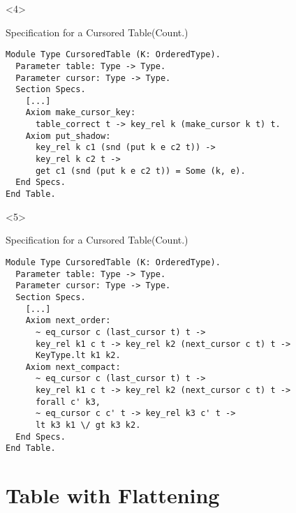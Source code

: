 \documentclass{beamer}
\begin{document}
\begin{frame}[t,fragile]
\begin{onlyenv}<4>
  \begin{block}{Specification for a Cursored Table(Count.)}
    \begin{verbatim}
Module Type CursoredTable (K: OrderedType).
  Parameter table: Type -> Type.
  Parameter cursor: Type -> Type.
  Section Specs.
    [...]
    Axiom make_cursor_key:
      table_correct t -> key_rel k (make_cursor k t) t.
    Axiom put_shadow:
      key_rel k c1 (snd (put k e c2 t)) ->
      key_rel k c2 t ->
      get c1 (snd (put k e c2 t)) = Some (k, e).
  End Specs.
End Table.
    \end{verbatim}
  \end{block}
\end{onlyenv}


\begin{onlyenv}<5>
  \begin{block}{Specification for a Cursored Table(Count.)}
    \begin{verbatim}
Module Type CursoredTable (K: OrderedType).
  Parameter table: Type -> Type.
  Parameter cursor: Type -> Type.
  Section Specs.
    [...]
    Axiom next_order:
      ~ eq_cursor c (last_cursor t) t ->
      key_rel k1 c t -> key_rel k2 (next_cursor c t) t ->
      KeyType.lt k1 k2.
    Axiom next_compact:
      ~ eq_cursor c (last_cursor t) t ->
      key_rel k1 c t -> key_rel k2 (next_cursor c t) t ->
      forall c' k3,
      ~ eq_cursor c c' t -> key_rel k3 c' t ->
      lt k3 k1 \/ gt k3 k2.
  End Specs.
End Table.
    \end{verbatim}
  \end{block}
\end{onlyenv}


\end{frame}

\section{Table with Flattening}
\end{document}
